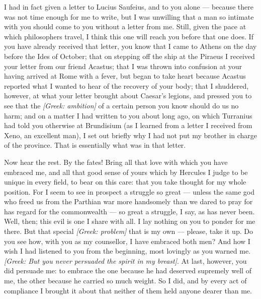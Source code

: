 

 I had in fact given a letter to Lucius Saufeius, and to you alone --- because there was not time enough for me to write, but I was unwilling that a man so intimate with you should come to you without a letter from me. Still, given the pace at which philosophers travel, I think this one will reach you before that one does. If you have already received that letter, you know that I came to Athens on the day before the Ides of October; that on stepping off the ship at the Piraeus I received your letter from our friend Acastus; that I was thrown into confusion at your having arrived at Rome with a fever, but began to take heart because Acastus reported what I wanted to hear of the recovery of your body; that I shuddered, however, at what your letter brought about Caesar's legions, and pressed you to see that the \textit{[Greek: ambition]} of a certain person you know should do us no harm; and on a matter I had written to you about long ago, on which Turranius had told you otherwise at Brundisium (as I learned from a letter I received from Xeno, an excellent man), I set out briefly why I had not put my brother in charge of the province. That is essentially what was in that letter.

 Now hear the rest. By the fates! Bring all that love with which you have embraced me, and all that good sense of yours which by Hercules I judge to be unique in every field, to bear on this care: that you take thought for my whole position. For I seem to see in prospect a struggle so great --- unless the same god who freed us from the Parthian war more handsomely than we dared to pray for has regard for the commonwealth --- so great a struggle, I say, as has never been. Well, then; this evil is one I share with all. I lay nothing on you to ponder for me there. But that special \textit{[Greek: problem]} that is my own --- please, take it up. Do you see how, with you as my counsellor, I have embraced both men? And how I wish I had listened to you from the beginning, most lovingly as you warned me. \textit{[Greek: But you never persuaded the spirit in my breast]}. At last, however, you did persuade me: to embrace the one because he had deserved supremely well of me, the other because he carried so much weight. So I did, and by every act of compliance I brought it about that neither of them held anyone dearer than me.

